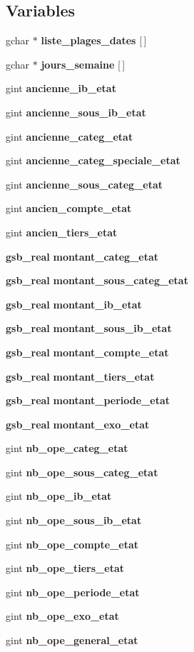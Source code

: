 \subsection*{Variables}
\begin{DoxyCompactItemize}
\item 
gchar $\ast$ {\bf liste\_\-plages\_\-dates} [$\,$]
\item 
gchar $\ast$ {\bf jours\_\-semaine} [$\,$]
\item 
gint {\bf ancienne\_\-ib\_\-etat}
\item 
gint {\bf ancienne\_\-sous\_\-ib\_\-etat}
\item 
gint {\bf ancienne\_\-categ\_\-etat}
\item 
gint {\bf ancienne\_\-categ\_\-speciale\_\-etat}
\item 
gint {\bf ancienne\_\-sous\_\-categ\_\-etat}
\item 
gint {\bf ancien\_\-compte\_\-etat}
\item 
gint {\bf ancien\_\-tiers\_\-etat}
\item 
{\bf gsb\_\-real} {\bf montant\_\-categ\_\-etat}
\item 
{\bf gsb\_\-real} {\bf montant\_\-sous\_\-categ\_\-etat}
\item 
{\bf gsb\_\-real} {\bf montant\_\-ib\_\-etat}
\item 
{\bf gsb\_\-real} {\bf montant\_\-sous\_\-ib\_\-etat}
\item 
{\bf gsb\_\-real} {\bf montant\_\-compte\_\-etat}
\item 
{\bf gsb\_\-real} {\bf montant\_\-tiers\_\-etat}
\item 
{\bf gsb\_\-real} {\bf montant\_\-periode\_\-etat}
\item 
{\bf gsb\_\-real} {\bf montant\_\-exo\_\-etat}
\item 
gint {\bf nb\_\-ope\_\-categ\_\-etat}
\item 
gint {\bf nb\_\-ope\_\-sous\_\-categ\_\-etat}
\item 
gint {\bf nb\_\-ope\_\-ib\_\-etat}
\item 
gint {\bf nb\_\-ope\_\-sous\_\-ib\_\-etat}
\item 
gint {\bf nb\_\-ope\_\-compte\_\-etat}
\item 
gint {\bf nb\_\-ope\_\-tiers\_\-etat}
\item 
gint {\bf nb\_\-ope\_\-periode\_\-etat}
\item 
gint {\bf nb\_\-ope\_\-exo\_\-etat}
\item 
gint {\bf nb\_\-ope\_\-general\_\-etat}

\end{DoxyCompactItemize}
